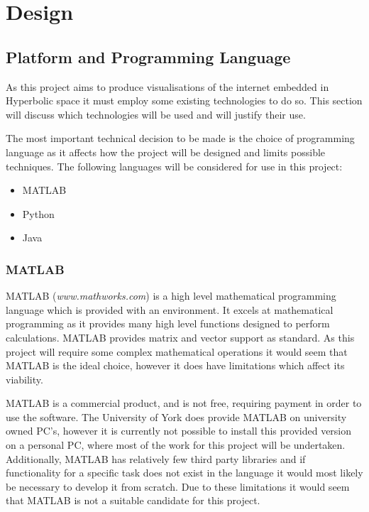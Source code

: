 \chapter{Design}
\label{cha:Design}

\section{Platform and Programming Language}
\label{sec:DesignLanguage}
As this project aims to produce visualisations of the internet embedded in Hyperbolic space it must employ some existing technologies to do so. This section will discuss which technologies will be used and will justify their use. 

The most important technical decision to be made is the choice of programming language as it affects how the project will be designed and limits possible techniques. The following languages will be considered for use in this project:

\begin{itemize}
	\item{MATLAB}
	\item{Python}
	\item{Java}
\end{itemize}

\subsection{MATLAB}
MATLAB (\textit{www.mathworks.com}) is a high level mathematical programming language which is provided with an environment. It excels at mathematical programming as it provides many high level functions designed to perform calculations. MATLAB provides matrix and vector support as standard. As this project will require some complex mathematical operations it would seem that MATLAB is the ideal choice, however it does have limitations which affect its viability. 

MATLAB is a commercial product, and is not free, requiring payment in order to use the software. The University of York does provide MATLAB on university owned PC's, however it is currently not possible to install this provided version on a personal PC, where most of the work for this project will be undertaken. Additionally, MATLAB has relatively few third party libraries and if functionality for a specific task does not exist in the language it would most likely be necessary to develop it from scratch. Due to these limitations it would seem that MATLAB is not a suitable candidate for this project.

